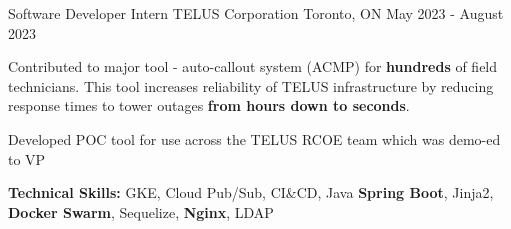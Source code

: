 \begin{cventries}
	\cventry
	{Software Developer Intern} %
	{TELUS Corporation} %
	{Toronto, ON} %
	{May 2023 - August 2023} %
	{
		\begin{cvitems} %
			\item {Contributed to major tool - auto-callout system (ACMP) for \textbf{hundreds} of field technicians. This tool increases reliability of TELUS infrastructure by reducing response times to tower outages \textbf{from hours down to seconds}.}
			\item {Developed POC tool for use across the TELUS RCOE team which was demo-ed to VP}
			\item[] {\textbf{Technical Skills:} GKE, Cloud Pub/Sub, CI\&CD, Java \textbf{Spring Boot}, Jinja2, \textbf{Docker Swarm}, Sequelize, \textbf{Nginx}, LDAP}
		\end{cvitems}
	}


\end{cventries}
